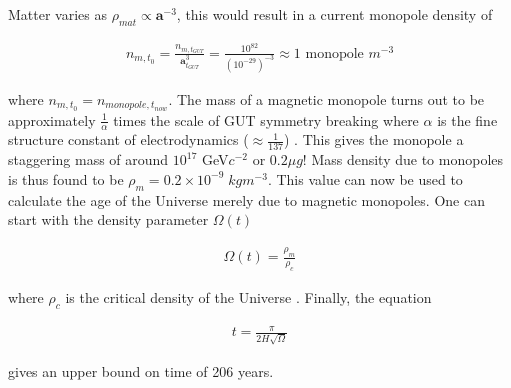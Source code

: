 \documentclass[fleqn, twocolumn, 10pt]{article}
\begin{document}
Matter varies as $\rho_{mat} \propto \bm{a}^{-3}$, this would result in a current monopole density of

\begin{ceqn}
\begin{align*}
n_{m,t_{0}} = \frac{n_{m,t_{GUT}}}{{\bm{a}_{t_{GUT}}^3}}= \frac{10^{82}}{(10^{-29})^{-3}} \approx 1 \text{ monopole } m^{-3}
\end{align*}
\end{ceqn}
where $n_{m,t_{0}} = n_{monopole,t_{now}}$. The mass of a magnetic monopole turns out to be approximately $\frac{1}{\alpha}$ times the scale of GUT symmetry breaking where $\alpha$ is the fine structure constant of electrodynamics ($\approx\frac{1}{137}$) \cite{guth2015lecs}. This gives the monopole a staggering mass of around $10^{17}$ GeV$c^{-2}$ or $0.2 \mu g$! Mass density due to monopoles is thus found to be $\rho_m = 0.2\times10^{-9}\; kgm^{-3}$. This value can now be used to calculate the age of the Universe merely due to magnetic monopoles. One can start with the density parameter $\Omega(t)$

\begin{ceqn}
\begin{align*}
\Omega(t) = \frac{\rho_m}{\rho_c}
\end{align*}
\end{ceqn}
where $\rho_c$ is the critical density of the Universe \cite{liddle2015cosmo}. Finally, the equation \cite{guth2015lecs}

\begin{ceqn}
\begin{align*}
t = \frac{\pi}{2H\sqrt\Omega}
\end{align*}
\end{ceqn}
gives an upper bound on time of 206 years. 
\end{document}
